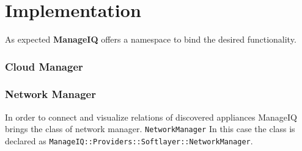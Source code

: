 \chapter{Implementation}
\label{chap:Implemented scheme}

As expected \textbf{ManageIQ} offers a namespace to bind the desired functionality.

\subsection{Cloud Manager}
\label{sub:Cloud Manager}



\subsection{Network Manager}
\label{sub:Network Manager}

In order to connect and visualize relations of discovered appliances ManageIQ brings the class of network manager. \texttt{NetworkManager} In this case the class is declared as \texttt{ManageIQ::Providers::Softlayer::NetworkManager}.
